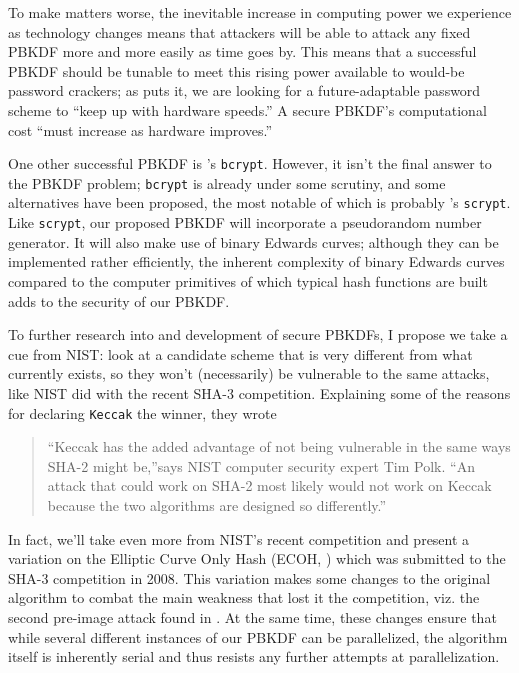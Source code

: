 To make matters worse, the inevitable increase in computing power we experience
    as technology changes means that attackers will be able to attack any fixed
    PBKDF more and more easily as time goes by.
This means that a successful PBKDF should be tunable to meet this rising power
    available to would-be password crackers; as \cite{provos1999future} puts
    it, we are looking for a future-adaptable password scheme to ``keep up with
    hardware speeds.''
A secure PBKDF's computational cost ``must increase as hardware improves.''

One other successful PBKDF is \cite{provos1999future}'s \texttt{bcrypt}.
However, it isn't the final answer to the PBKDF problem; \texttt{bcrypt} is
    already under some scrutiny, and some alternatives have been proposed, the
    most notable of which is probably \cite{percival2009stronger}'s
    \texttt{scrypt}.
Like \texttt{scrypt}, our proposed PBKDF will incorporate a pseudorandom
    number generator.
It will also make use of binary Edwards curves; although they can be
    implemented rather efficiently, the inherent complexity of binary Edwards
    curves compared to the computer primitives of which typical hash functions
    are built adds to the security of our PBKDF.

To further research into and development of secure PBKDFs, I propose we take a
    cue from NIST: look at a candidate scheme that is very different
    from what currently exists, so they won't (necessarily) be vulnerable to
    the same attacks, like NIST did with the recent SHA-3 competition.
Explaining some of the reasons for declaring \texttt{Keccak} the winner, they
    wrote
    \begin{quote}
    ``Keccak has the added advantage of not being vulnerable in the same ways
    SHA-2 might be,''says NIST computer security expert Tim Polk. ``An attack
    that could work on SHA-2 most likely would not work on Keccak because the
    two algorithms are designed so differently.'' \cite{baum2012nist}
    \end{quote}
In fact, we'll take even more from NIST's recent competition and present a
    variation on the Elliptic Curve Only Hash (ECOH, \cite{brown2008ecoh})
    which was submitted to the SHA-3 competition in 2008.
This variation makes some changes to the original algorithm to combat the
    main weakness that lost it the competition, viz. the second pre-image
    attack found in \cite{halcrow2009second, cryptoeprint:2009:168}.
At the same time, these changes ensure that while several different instances
    of our PBKDF can be parallelized, the algorithm itself is inherently serial
    and thus resists any further attempts at parallelization.


